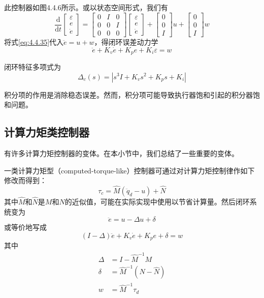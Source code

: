 \documentclass[UTF8]{ctexart}
\theoremstyle{definition}
\newcommand{\dd}{\mathrm{d}}
\begin{document}
此控制器如图4.4.6所示。或以状态空间形式，我们有
\begin{equation}\label{eq:4.4.37}
    \frac{\dd}{\dd t}\begin{bmatrix} \varepsilon \\ e \\ \dot{e} \end{bmatrix} = \begin{bmatrix} 0 & I & 0 \\ 0 & 0 & I \\ 0 & 0 & 0 \end{bmatrix}\begin{bmatrix} \varepsilon \\ e \\ \dot{e} \end{bmatrix} + \begin{bmatrix} 0 \\ 0 \\ I \end{bmatrix}u + \begin{bmatrix} 0 \\ 0 \\ I \end{bmatrix}w
\end{equation}
将式\eqref{eq:4.4.35}代入$\ddot{e}=u+w$，得闭环误差动力学
\begin{equation}\label{eq:4.4.38}
    \ddot{e} + K_v\dot{e} + K_pe + K_i\varepsilon = w
\end{equation}

闭环特征多项式为
\begin{equation}\label{eq:4.4.39}
    \Delta_c(s) = |s^3 I + K_v s^2 + K_p s + K_i|
\end{equation}

积分项的作用是消除稳态误差。然而，积分项可能导致执行器饱和引起的积分器饱和问题。

\setcounter{equation}{42}
\subsection{计算力矩类控制器}

有许多计算力矩控制器的变体。在本小节中，我们总结了一些重要的变体。

一类计算力矩型（computed-torque-like）控制器可通过对计算力矩控制律作如下修改而得到：
\begin{equation}\label{eq:4.4.43}
    \tau_c = \hat{M} (\ddot{q}_d - u) + \hat{N}
\end{equation}
其中$\hat{M}$和$\hat{N}$是$M$和$N$的近似值，可能在实际实现中使用以节省计算量。然后闭环系统变为
\begin{equation}\label{eq:4.4.44}
    \ddot{e} = u - \Delta u + \delta
\end{equation}
或等价地写成
\begin{equation}\label{eq:4.4.45}
    (I - \Delta)\ddot{e} + K_v\dot{e} + K_pe + \delta = w
\end{equation}
其中
\begin{align}
    \Delta &= I - \hat{M}^{-1}M \label{eq:4.4.46}\\
    \delta &= \hat{M}^{-1}(N - \hat{N}) \label{eq:4.4.47}\\
    w &= \hat{M}^{-1}\tau_d \label{eq:4.4.48}
\end{align}
\end{document}
